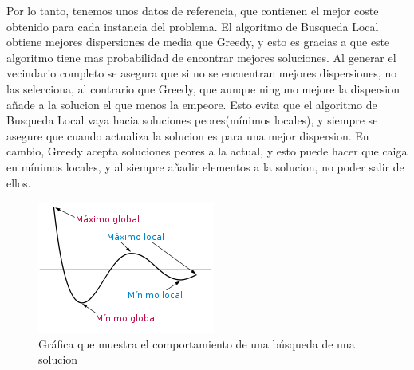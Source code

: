 \documentclass{article}
\begin{document}
\vspace{10mm}
Por lo tanto, tenemos unos datos de referencia, que contienen el mejor coste obtenido para 
cada instancia del problema.
El algoritmo de Busqueda Local obtiene mejores dispersiones de media que Greedy, y esto es gracias a que 
este algoritmo tiene mas probabilidad de encontrar mejores soluciones.
\newline Al generar el vecindario completo se asegura que si no se encuentran mejores 
dispersiones, no las selecciona, al contrario que Greedy, que aunque ninguno mejore la dispersion 
añade a la solucion el que menos la empeore.
\newline Esto evita que el algoritmo de Busqueda Local vaya hacia soluciones peores(mínimos locales), y siempre 
se asegure que cuando actualiza la solucion es para una mejor dispersion. 
\newpage En cambio, Greedy acepta soluciones peores a la actual, y esto puede hacer que caiga en mínimos locales,
y al siempre añadir elementos a la solucion, no poder salir de ellos.

\begin{figure}[h]
  \centering
  \includegraphics[scale=0.5]{MinLocal.png}
  \caption{Gráfica que muestra el comportamiento de una búsqueda de una solucion}
\end{figure}
\end{document}
